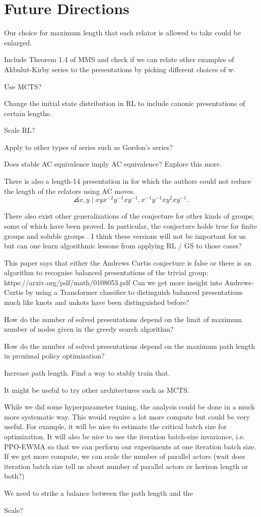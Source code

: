 
\section{Future Directions}

Our choice for maximum length that each relator is allowed to take could be enlarged. 

Include Theorem 1.4 of MMS and check if we can relate other examples of Akbulut-Kirby series to the presentations by picking different choices of w.

Use MCTS?

Change the initial state distribution in RL to include canonic presentations of certain lengths.

Scale RL?

Apply to other types of series such as Gordon's series?

Does stable AC equivalence imply AC equivalence? Explore this more.

There is also a length-14 presentation in \cite{MMS} for which the authors could not reduce the length of the relators using AC moves.
\[
\angles{x, y \mid xyx^{-2}y^{-1} xy^{-1}, x^{-1} y^{-1} x y^2 x y^{-1}}.
\]

There also exist other generalizations of the conjecture for other kinds of groups; some of which have been proved.
In particular, the conjecture holds true for finite groups and soluble groups \cite{Borovik, Guyot}.
I think these versions will not be important for us but can one learn algorithmic lessons from applying RL / GS to those cases?

 This paper says that either the Andrews Curtis conjecture is false or there is an algorithm to recognise balanced presentations of the trivial group: https://arxiv.org/pdf/math/0108053.pdf
Can we get more insight into Andrews-Curtis by using a Transformer classifier to distinguish balanced presentations much like knots and unkots have been distinguished before?

How do the number of solved presentations depend on the limit of maximum number of nodes given in the greedy search algorithm? 

How do the number of solved presentations depend on the maximum path length in proximal policy optimization?

Increase path length. Find a way to stably train that. 

It might be useful to try other architectures such as MCTS.

While we did some hyperparameter tuning, the analysis could be done in a much more systematic way. This would require a lot more compute but could be very useful. For example, it will be nice to estimate the critical batch size for optimization. It will also be nice to use the iteration batch-size invariance, i.e. PPO-EWMA so that we can perform our experiments at one iteration batch size. If we get more compute, we can scale the number of parallel actors (wait does iteration batch size tell us about number of parallel actors or horizon length or both?)

We need to strike a balance between the path length and the 

Scale?